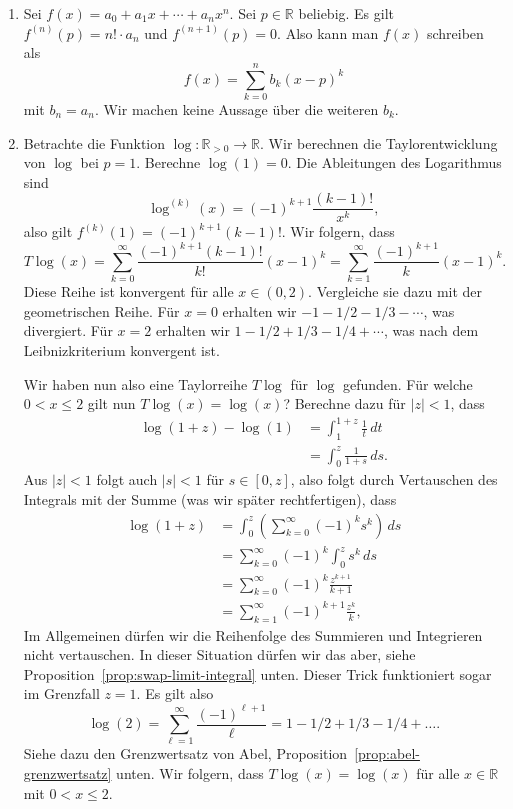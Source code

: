 \documentclass[../main.tex]{subfiles}
\begin{document}
\begin{examples}
  \leavevmode
  \begin{enumerate}[(1)]
    \item Sei $f(x) = a_0 + a_1 x + \cdots + a_n x^n$.
      Sei $p \in \mathbb{R}$ beliebig.
      Es gilt $f^{(n)}(p) = n! \cdot a_n$ und
      $f^{(n+1)}(p) = 0$. Also kann man $f(x)$ schreiben als
      \[
        f(x) = \sum_{k=0}^{n} b_k {(x - p)}^k
      \]
      mit $b_n = a_n$. Wir machen keine Aussage über die weiteren $b_k$.
    \item Betrachte die Funktion  $\log \colon \mathbb{R}_{>0} \to \mathbb{R}$.
      Wir berechnen die Taylorentwicklung von $\log$ bei $p = 1$.
      Berechne $\log(1) = 0$. Die Ableitungen des Logarithmus sind
      \[
        \log^{(k)}(x) = {(-1)}^{k+1} \frac{(k-1)!}{x^k},
      \]
      also gilt $f^{(k)}(1) = {(-1)}^{k+1} (k-1)!$.
      Wir folgern, dass
      \[
        T\log(x) = \sum_{k=0}^{\infty} \frac{{(-1)}^{k+1}(k-1)!}{k!}{(x-1)}^k
        = \sum_{k=1}^{\infty} \frac{{(-1)}^{k+1}}{k}{(x-1)}^k.
      \]
      Diese Reihe ist konvergent für alle $x \in (0, 2)$.
      Vergleiche sie dazu mit der geometrischen Reihe.
      Für $x = 0$ erhalten wir $-1 -1/2 - 1/3 - \cdots$, was divergiert.
      Für $x = 2$ erhalten wir $1 - 1/2 + 1/3 - 1/4 + \cdots$, was nach
      dem Leibnizkriterium konvergent ist.

      Wir haben nun also eine Taylorreihe $T\log$ für $\log$ gefunden.
      Für welche $0 < x \leq 2$ gilt nun $T\log(x) = \log(x)$?
      Berechne dazu für $|z| < 1$, dass
      \begin{align*}
         \log(1 + z) - \log(1)
         &= \int_{1}^{1+z} \frac{1}{t} \, dt  \\
         &= \int_{0}^{z} \frac{1}{1+s} \, ds.
      \end{align*}
      Aus $|z| < 1$ folgt auch $|s| < 1$ für $s \in [0, z]$, also folgt
      durch Vertauschen des Integrals mit der Summe (was wir später rechtfertigen),
      dass
      \begin{align*}
        \log(1+z)
        & = \int_{0}^{z} \left( \sum_{k=0}^{\infty} {(-1)}^k s^k \right) \, ds\\
        &= \sum_{k=0}^{\infty} {(-1)}^k \int_{0}^{z} s^k \, ds\\
        &= \sum_{k=0}^{\infty} {(-1)}^k \frac{z^{k+1}}{k+1}\\
        &= \sum_{k=1}^{\infty} {(-1)}^{k+1} \frac{z^k}{k},
      \end{align*}
      Im Allgemeinen dürfen wir die Reihenfolge des Summieren und Integrieren
      nicht vertauschen. In dieser Situation dürfen wir das aber, 
      siehe
      Proposition~\ref{prop:swap-limit-integral} unten.
      Dieser Trick funktioniert sogar im Grenzfall $z = 1$. Es gilt also
      \[
        \log(2) = \sum_{\ell = 1}^{\infty} \frac{{(-1)}^{\ell+1}}{\ell}
        = 1 - 1/2 + 1/3 - 1/4 + \dots.
      \]
      Siehe dazu den Grenzwertsatz von Abel, Proposition~\ref{prop:abel-grenzwertsatz} unten.
      Wir folgern, dass $T\log(x) = \log(x)$ für alle $x \in \mathbb{R}$
      mit $0 < x \leq 2$.
  \end{enumerate}
\end{examples}
\end{document}
